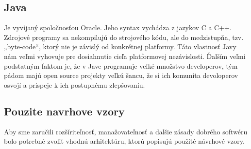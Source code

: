 \subsection{Java}
\indent Je vyvíjaný spoločnosťou Oracle. Jeho syntax vychádza z jazykov C a C++. Zdrojové programy sa nekompilujú do strojového kódu, ale do medzistupňa, tzv. „byte-code“, ktorý nie je závislý od konkrétnej platformy. Táto vlastnosť Javy nám veľmi vyhovuje pre dosiahnutie cieľa platformovej nezávislosti. Ďalším veľmi podstatným faktom je, že v Jave programuje veľké množstvo developerov, tým pádom majú open source projekty veľkú šancu, že si ich komunita devoloperov osvojí a prispeje k ich postupnému zlepšovaniu.

\subsection{Pouzite navrhove vzory}
Aby sme zaručili rozšíriteľnosť, manažovateľnosť a ďalšie zásady dobrého softwéru bolo potrebné zvoliť vhodnú arhitektúru, ktorú popisujú použité návrhové vzory.
